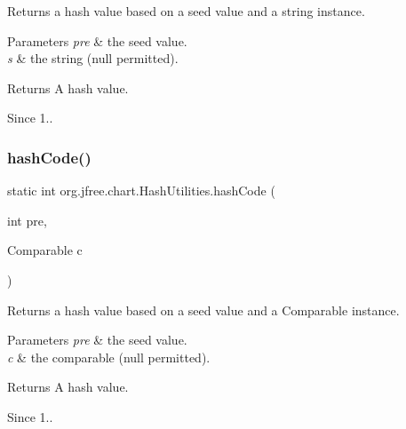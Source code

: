 Returns a hash value based on a seed value and a string instance.


\begin{DoxyParams}{Parameters}
{\em pre} & the seed value. \\
\hline
{\em s} & the string ({\ttfamily null} permitted).\\
\hline
\end{DoxyParams}
\begin{DoxyReturn}{Returns}
A hash value.
\end{DoxyReturn}
\begin{DoxySince}{Since}
1.. 
\end{DoxySince}
\mbox{\label{classorg_1_1jfree_1_1chart_1_1_hash_utilities_a1c0e9a0350bf1436b2637133979fc60e}} 
\subsubsection{\texorpdfstring{hash\+Code()}{hashCode()}\hspace{0.1cm}{\footnotesize\ttfamily [7/11]}}
{\footnotesize\ttfamily static int org.\+jfree.\+chart.\+Hash\+Utilities.\+hash\+Code (\begin{DoxyParamCaption}\item[{int}]{pre,  }\item[{Comparable}]{c }\end{DoxyParamCaption})\hspace{0.3cm}{\ttfamily [static]}}

Returns a hash value based on a seed value and a {\ttfamily Comparable} instance.


\begin{DoxyParams}{Parameters}
{\em pre} & the seed value. \\
\hline
{\em c} & the comparable ({\ttfamily null} permitted).\\
\hline
\end{DoxyParams}
\begin{DoxyReturn}{Returns}
A hash value.
\end{DoxyReturn}
\begin{DoxySince}{Since}
1.. 
\end{DoxySince}
\mbox{\label{classorg_1_1jfree_1_1chart_1_1_hash_utilities_a1c8dcc152204db64fb0440a1506fa6da}} 
